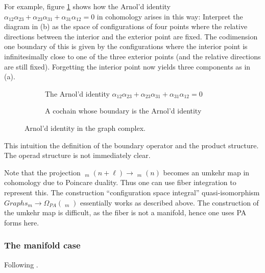 \documentclass{scrartcl}
\theoremstyle{plain}
\theoremstyle{definition}
\DeclareMathOperator{\cConf}{\overline{Conf}}
\begin{document}
For example, figure \ref{graph-complex-ex} shows how the Arnol'd identity $\alpha_{12}\alpha_{23} + \alpha_{23}\alpha_{31} + \alpha_{31}\alpha_{12} = 0$ in cohomology arises in this way: Interpret the diagram in (b) as the space of configurations of four points where the relative directions between the interior and the exterior point are fixed. The codimension one boundary of this is given by the configurations where the interior point is infinitesimally close to one of the three exterior points (and the relative directions are still fixed). Forgetting the interior point now yields three components as in (a).  

\begin{figure}[ht]
    \centering
    \begin{subfigure}[b]{0.65\textwidth}
        \centering
        
        \caption{The Arnol'd identity $\alpha_{12}\alpha_{23} + \alpha_{23}\alpha_{31} + \alpha_{31}\alpha_{12} = 0$}
    \end{subfigure}
    \hfill
    \begin{subfigure}[b]{0.3\textwidth}
        \centering
        
        \caption{A cochain whose boundary is the Arnol'd identity}
    \end{subfigure} 
    \caption{Arnol'd identity in the graph complex. }\label{graph-complex-ex}
\end{figure}

This intuition the definition of the boundary operator and the product structure. The operad structure is not immediately clear. 

Note that the projection $\cConf_m(n+\ell) \to \cConf_m(n)$ becomes an umkehr map in cohomology due to Poincare duality. Thus one can use fiber integration to represent this. The construction ``configuration space integral'' quasi-isomorphism $Graphs_m \to \Omega_{PA}(\cConf_m)$ essentially works as described above. The construction of the umkehr map is difficult, as the fiber is not a manifold, hence one uses PA forms here. 

\subsubsection{The manifold case}

Following \cite{campos2016model}. 

\end{document}
